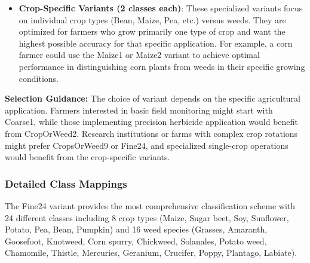 \begin{itemize}
    \item \textbf{Crop-Specific Variants (2 classes each)}: These specialized variants focus on individual crop types (Bean, Maize, Pea, etc.) versus weeds. They are optimized for farmers who grow primarily one type of crop and want the highest possible accuracy for that specific application. For example, a corn farmer could use the Maize1 or Maize2 variant to achieve optimal performance in distinguishing corn plants from weeds in their specific growing conditions.
\end{itemize}

\textbf{Selection Guidance:} The choice of variant depends on the specific agricultural application. Farmers interested in basic field monitoring might start with Coarse1, while those implementing precision herbicide application would benefit from CropOrWeed2. Research institutions or farms with complex crop rotations might prefer CropsOrWeed9 or Fine24, and specialized single-crop operations would benefit from the crop-specific variants.

\subsubsection{Detailed Class Mappings}

The Fine24 variant provides the most comprehensive classification scheme with 24 different classes including 8 crop types (Maize, Sugar beet, Soy, Sunflower, Potato, Pea, Bean, Pumpkin) and 16 weed species (Grasses, Amaranth, Goosefoot, Knotweed, Corn spurry, Chickweed, Solanales, Potato weed, Chamomile, Thistle, Mercuries, Geranium, Crucifer, Poppy, Plantago, Labiate).
